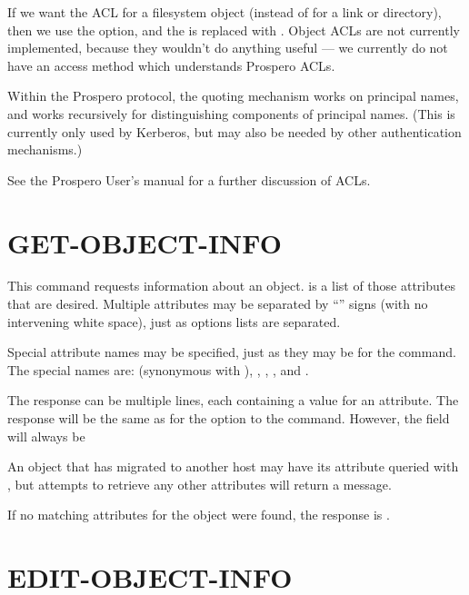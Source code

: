 If we want the ACL for a filesystem object (instead of for a link or
directory), then we use the  option, and the
 is replaced with 
 \zoos{}\zooe.  Object ACLs are not currently implemented, because
they wouldn't do anything useful --- we currently do not have an
access method which understands Prospero ACLs.

Within the Prospero protocol, the quoting mechanism works on principal
names, and works recursively for distinguishing components of
principal names.  (This is currently only used by Kerberos, but may also
be needed by other authentication mechanisms.)

See the Prospero User's manual for a further discussion of ACLs.

\section{GET-OBJECT-INFO}

\begin{command}
\commandsize
{}  
 
\selectlines
\end{command}

This command requests information about an object.
 is a list of those attributes
that are desired.  Multiple attributes may be separated by ``\lit{+}'' signs
(with no intervening white space), just as options lists are
separated.

Special attribute names may be specified, just as they may be for the
 command.  The special names are:  (synonymous
with ), , , , and
. 

The response can be multiple lines, each containing a value for an
attribute.  The response will be the same as for the 
option to the  command.  However, the 
field will always be 

An object that has migrated to another host may have its
 attribute queried with ,
but attempts to retrieve any other attributes will return a
 message.

If no matching attributes for the object were found, the response is
. 

\section{EDIT-OBJECT-INFO}

